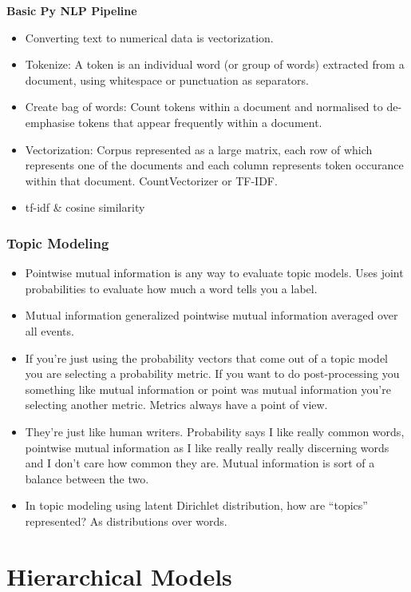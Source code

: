 \documentclass[]{book}
\theoremstyle{definition}
\theoremstyle{definition}
\theoremstyle{definition}
\theoremstyle{remark}
\begin{document}
\textbf{Basic Py NLP Pipeline}

\begin{itemize}
\item
  Converting text to numerical data is vectorization.
\item
  Tokenize: A token is an individual word (or group of words) extracted
  from a document, using whitespace or punctuation as separators.
\item
  Create bag of words: Count tokens within a document and normalised to
  de-emphasise tokens that appear frequently within a document.
\item
  Vectorization: Corpus represented as a large matrix, each row of which
  represents one of the documents and each column represents token
  occurance within that document. CountVectorizer or TF-IDF.
\item
  tf-idf \& cosine similarity
\end{itemize}

\subsection{Topic Modeling}\label{topic-modeling}

\begin{itemize}
\item
  Pointwise mutual information is any way to evaluate topic models. Uses
  joint probabilities to evaluate how much a word tells you a label.
\item
  Mutual information generalized pointwise mutual information averaged
  over all events.
\item
  If you're just using the probability vectors that come out of a topic
  model you are selecting a probability metric. If you want to do
  post-processing you something like mutual information or point was
  mutual information you're selecting another metric. Metrics always
  have a point of view.
\item
  They're just like human writers. Probability says I like really common
  words, pointwise mutual information as I like really really really
  discerning words and I don't care how common they are. Mutual
  information is sort of a balance between the two.
\item
  In topic modeling using latent Dirichlet distribution, how are
  ``topics'' represented? As distributions over words.
\end{itemize}

\chapter{Hierarchical Models}\label{hierarchical-models}
\end{document}
